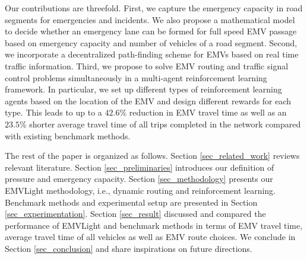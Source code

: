 Our contributions are threefold. First, we capture the emergency capacity in road segments for emergencies and incidents. We also propose a mathematical model to decide whether an emergency lane can be formed for full speed EMV passage based on emergency capacity and number of vehicles of a road segment.
Second, we incorporate a decentralized path-finding scheme for EMVs based on real time traffic information. Third, we propose to solve EMV routing and traffic signal control problems simultaneously in a multi-agent reinforcement learning framework. In particular, we set up different types of reinforcement learning agents based on the location of the EMV and design different rewards for each type. This leads to up to a $42.6\%$ reduction in EMV travel time as well as an $23.5\%$ shorter average travel time of all trips completed in the network compared with existing benchmark methods.


The rest of the paper is organized as follows. Section \ref{sec_related_work} reviews relevant literature. Section \ref{sec_preliminaries} introduces our definition of pressure and emergency capacity. Section \ref{sec_methodology} presents our EMVLight methodology, i.e.,  dynamic routing and reinforcement learning. Benchmark methods and experimental setup are presented in Section \ref{sec_experimentation}. Section \ref{sec_result} discussed and compared the performance of EMVLight and benchmark methods in terms of EMV travel time, average travel time of all vehicles as well as EMV route choices. We conclude in Section \ref{sec_conclusion} and share inspirations on future directions.






